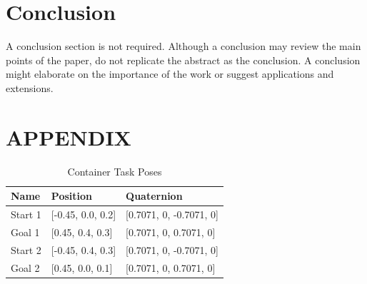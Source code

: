 \documentclass[defaultstyle,11pt]{thesis}
\begin{document}
\section{Conclusion}

A conclusion section is not required. Although a conclusion may review the main points of the paper, do not replicate the abstract as the conclusion. A conclusion might elaborate on the importance of the work or suggest applications and extensions. 

\addtolength{\textheight}{-12cm}   %







\section*{APPENDIX}

\begin{table}[H]
    \centering
    \caption{Container Task Poses}
    \label{tab:containerPoses}
    \begin{tabular}{lll}
    \hline
    \textbf{Name} & \textbf{Position} & \textbf{Quaternion} \\
    \hline
    Start 1 & [-0.45, 0.0, 0.2] & [0.7071, 0, -0.7071, 0] \\
    Goal 1 & [0.45, 0.4, 0.3] & [0.7071, 0, 0.7071, 0] \\
    Start 2 & [-0.45, 0.4, 0.3] & [0.7071, 0, -0.7071, 0] \\
    Goal 2 & [0.45, 0.0, 0.1] & [0.7071, 0, 0.7071, 0] \\
    \hline
    \end{tabular}
\end{table}
\end{document}
